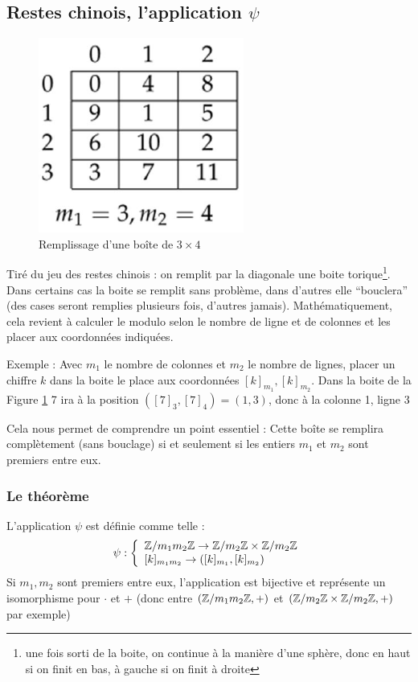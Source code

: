 \documentclass[11pt,a4paper]{article}
\renewcommand{\)}{\right)}
\renewcommand{\(}{\left(}
\begin{document}
\subsection{Restes chinois, l'application $\psi$}
\begin{figure}
	\includegraphics[scale=0.5]{images/chinois}
	\caption{Remplissage d'une boîte de $3\times 4$}
	\label{chinois}
\end{figure}
Tiré du jeu des restes chinois : on remplit par la diagonale une boite torique\footnote{une fois sorti de la boite, on continue à la manière d'une sphère, donc en haut si on finit en bas, à gauche si on finit à droite}. Dans certains cas la boite se remplit sans problème, dans d'autres elle \enquote{bouclera} (des cases seront remplies plusieurs fois, d'autres jamais). Mathématiquement, cela revient à calculer le modulo selon le nombre de ligne et de colonnes et les placer aux coordonnées indiquées. 
\begin{exemple}[0.7]
Exemple : Avec $m_1$ le nombre de colonnes et $m_2$ le nombre de lignes, placer un chiffre $k$ dans la boite le place aux coordonnées $[k]_{m_1},[k]_{m_2}$. Dans la boite de la Figure \ref{chinois} 7 ira à la position $([7]_{3},[7]_4) = (1,3)$, donc à la colonne 1, ligne 3
\end{exemple}
Cela nous permet de comprendre un point essentiel : Cette boîte se remplira complètement (sans bouclage) si et seulement si les  entiers $m_1$ et $m_2$ sont premiers entre eux.

\subsubsection{Le théorème}
L'application $\psi$ est définie comme telle :
\[\psi : \left\{\begin{array}{l}
	\mathbb{Z}/m_1m_2\mathbb{Z} \to \mathbb{Z} / m_2 \mathbb{Z} \times \mathbb{Z} / m_2 \mathbb{Z} \\
	{}[k]_{m_1 m_2} \to ([k]_{m_1},[k]_{m_2})
\end{array}\right.\]
Si $m_1,m_2$ sont premiers entre eux, l'application est bijective et représente un isomorphisme pour $\cdot$ et $+$ (donc entre $(\mathbb{Z}/m_1m_2\mathbb{Z}, +)$ et $(\mathbb{Z}/m_2\mathbb{Z}\times \mathbb{Z}/m_2\mathbb{Z}, +)$ par exemple)
\end{document}
